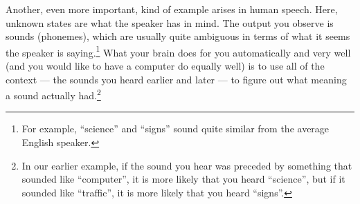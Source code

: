 \documentclass[10pt]{article}
\begin{document}







Another, even more important, kind of example arises in human speech. Here, unknown states are what the speaker has in mind. The output you observe is sounds (phonemes), which are usually quite ambiguous in terms of what it seems the speaker is saying.\footnote{For example, ``science'' and ``signs'' sound quite similar from the average English speaker.} What your brain does for you automatically and very well (and you would like to have a computer do equally well) is to use all of the context --- the sounds you heard earlier and later --- to figure out what meaning a sound actually had.\footnote{In our earlier example, if the sound you hear was preceded by something that sounded like ``computer'', it is more likely that you heard ``science'', but if it sounded like ``traffic'', it is more likely that you heard ``signs''.}
\end{document}
